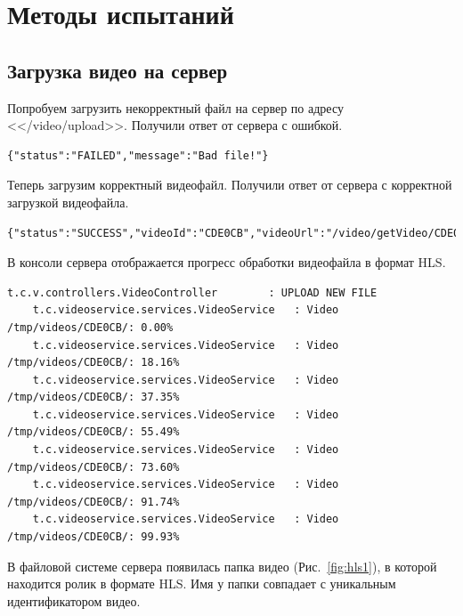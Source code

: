 \documentclass{../../includes/TechDoc}
\begin{document}
    \section{Методы испытаний}

    \subsection{Загрузка видео на сервер}

    Попробуем загрузить некорректный файл на сервер по адресу <</video/upload>>.
    Получили ответ от сервера с ошибкой.

    \begin{lstlisting}[language=text,caption={Ответ сервера при загрузке некорректного файла}]
    {"status":"FAILED","message":"Bad file!"}
    \end{lstlisting}

    Теперь загрузим корректный видеофайл.
    Получили ответ от сервера с корректной загрузкой видеофайла.

    \begin{lstlisting}[language=text,caption={Ответ сервера при загрузке корректного файла}]
    {"status":"SUCCESS","videoId":"CDE0CB","videoUrl":"/video/getVideo/CDE0CB/video.m3u8"}
    \end{lstlisting}

    В консоли сервера отображается прогресс обработки видеофайла в формат HLS.

    \begin{lstlisting}[language=text,caption={Информация об обработке файла в консоли}]
    t.c.v.controllers.VideoController        : UPLOAD NEW FILE
    t.c.videoservice.services.VideoService   : Video /tmp/videos/CDE0CB/: 0.00%
    t.c.videoservice.services.VideoService   : Video /tmp/videos/CDE0CB/: 18.16%
    t.c.videoservice.services.VideoService   : Video /tmp/videos/CDE0CB/: 37.35%
    t.c.videoservice.services.VideoService   : Video /tmp/videos/CDE0CB/: 55.49%
    t.c.videoservice.services.VideoService   : Video /tmp/videos/CDE0CB/: 73.60%
    t.c.videoservice.services.VideoService   : Video /tmp/videos/CDE0CB/: 91.74%
    t.c.videoservice.services.VideoService   : Video /tmp/videos/CDE0CB/: 99.93%
    \end{lstlisting}

    В файловой системе сервера появилась папка видео (Рис.~\ref{fig:hls1}), в которой находится ролик в формате HLS.
    Имя у папки совпадает с уникальным идентификатором видео.
\end{document}
